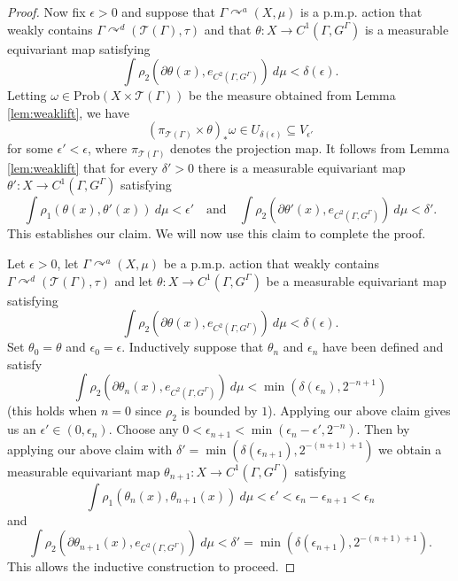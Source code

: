 \documentclass[12pt]{amsart}
\theoremstyle{definition}
\def\cal{\mathcal}
\newcommand{\pmp}{p{$.$}m{$.$}p{$.$}}
\newcommand{\acts}{\curvearrowright}
\newcommand{\Prob}{\mathrm{Prob}}
\begin{document}
\begin{proof}
	Now fix $\epsilon > 0$ and suppose that $\Gamma \acts^a (X, \mu)$ is a {\pmp} action that weakly contains $\Gamma \acts^d (\cal T(\Gamma), \tau)$ and that $\theta: X \rightarrow C^1(\Gamma, G^\Gamma)$ is a measurable equivariant map satisfying
	\[\int \rho_2(\partial \theta(x), e_{C^2(\Gamma, G^\Gamma)}) \ d \mu < \delta(\epsilon).\]
	Letting $\omega \in \Prob(X \times \cal T(\Gamma))$ be the measure obtained from Lemma \ref{lem:weaklift}, we have
	\[(\pi_{\cal T(\Gamma)} \times \theta)_* \omega \in U_{\delta(\epsilon)} \subseteq V_{\epsilon'}\]
	for some $\epsilon' < \epsilon$, where $\pi_{\cal T(\Gamma)}$ denotes the projection map. It follows from Lemma \ref{lem:weaklift} that for every $\delta' > 0$ there is a measurable equivariant map $\theta' : X \rightarrow C^1(\Gamma, G^\Gamma)$ satisfying
	\[\int \rho_1(\theta(x), \theta'(x)) \ d \mu < \epsilon' \quad \text{and} \quad \int \rho_2(\partial \theta'(x), e_{C^2(\Gamma, G^\Gamma)}) \ d \mu < \delta'.\]
	This establishes our claim. We will now use this claim to complete the proof.
	
	Let $\epsilon > 0$, let $\Gamma \acts^a (X, \mu)$ be a {\pmp} action that weakly contains $\Gamma \acts^d (\cal T(\Gamma), \tau)$ and let $\theta : X \rightarrow C^1(\Gamma, G^\Gamma)$ be a measurable equivariant map satisfying $$\int \rho_2(\partial \theta(x), e_{C^2(\Gamma, G^\Gamma)}) \ d \mu < \delta(\epsilon).$$ Set $\theta_0 = \theta$ and $\epsilon_0 = \epsilon$. Inductively suppose that $\theta_n$ and $\epsilon_n$ have been defined and satisfy
	\[\int \rho_2(\partial \theta_n(x), e_{C^2(\Gamma, G^\Gamma)}) \ d \mu < \min(\delta(\epsilon_n), 2^{-n+1})\]
	(this holds when $n = 0$ since $\rho_2$ is bounded by $1$). Applying our above claim gives us an $\epsilon' \in (0, \epsilon_n)$. Choose any $0 < \epsilon_{n+1} < \min(\epsilon_n - \epsilon', 2^{-n})$. Then by applying our above claim with $\delta' = \min(\delta(\epsilon_{n+1}), 2^{-(n+1)+1})$ we obtain a measurable equivariant map $\theta_{n+1} : X \rightarrow C^1(\Gamma, G^\Gamma)$ satisfying
	\[\int \rho_1(\theta_n(x), \theta_{n+1}(x)) \ d \mu < \epsilon' < \epsilon_n - \epsilon_{n+1} < \epsilon_n\]
	and
	\[\int \rho_2(\partial \theta_{n+1}(x), e_{C^2(\Gamma, G^\Gamma)}) \ d \mu < \delta' = \min(\delta(\epsilon_{n+1}), 2^{-(n+1)+1}).\]
	This allows the inductive construction to proceed.
	

\end{proof}
\end{document}
